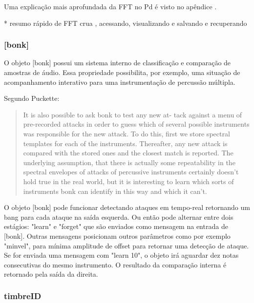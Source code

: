 \documentclass[draft]{ppgmus}
\begin{document}
Uma explicação mais aprofundada da FFT no Pd é visto no apêndice \label{fftpd}.

* resumo rápido de FFT crua , acessando, visualizando e salvando e recuperando

\subsubsection{[bonk\texttildelow]}


O objeto [bonk\texttildelow] possui um sistema interno de classificação
e comparação de amostras de áudio. Essa propriedade possibilita, por exemplo, 
uma situação de acompanhamento interativo para uma instrumentação de 
percussão múltipla.

Segundo Puckette:

\begin{quotation}
It is also possible to ask bonk to test any new at-
tack against a menu of pre-recorded attacks in order
to guess which of several possible instruments was
responsible for the new attack. To do this, first we
store spectral templates for each of the instruments.
Thereafter, any new attack is compared with the
stored ones and the closest match is reported. The
underlying assumption, that there is actually some
repeatability in the spectral envelopes of attacks of
percussive instruments certainly doesn't hold true in
the real world, but it is interesting to learn which
sorts of instruments bonk can identify in this way
and which it can't.
\end{quotation}

O objeto [bonk\texttildelow] pode funcionar detectando
ataques em tempo-real retornando um bang para cada ataque 
na saída esquerda. Ou então pode alternar entre dois estágios:
"learn" e "forget" que são enviados como mensagem na entrada de 
[bonk\texttildelow]. Outras mensagens posicionam outros
parâmetros como por exemplo "minvel", para mínima amplitude de offset
para retornar uma detecção de ataque.
Se for enviada uma mensagem com "learn 10",
o objeto irá aguardar dez notas consecutivas do mesmo instrumento.
O resultado da comparação interna é retornado pela saída da direita.



\subsubsection{timbreID}
\end{document}
